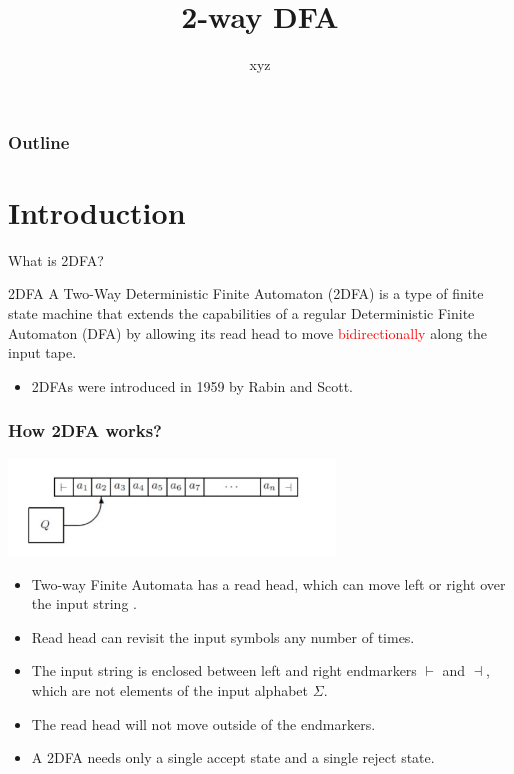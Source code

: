 \documentclass{beamer}
\title[Finite-State Automata]{2-way DFA}
\author{xyz}
\begin{document}
\begin{frame}
\frametitle{Outline}
\tableofcontents
\end{frame}

\section{Introduction}

\begin{frame}{What is 2DFA?}
  \begin{block}{2DFA}
    A Two-Way Deterministic Finite Automaton (2DFA) is a type of finite state machine that extends the capabilities of a regular Deterministic Finite Automaton (DFA) by allowing its read head to move \textcolor{red}{bidirectionally} along the input tape. 
   
    
  \end{block}
  \begin{itemize}
    \item 2DFAs were introduced in 1959 by Rabin and Scott.
   \end{itemize}

\end{frame}

\begin{frame}
\frametitle{How 2DFA works?}
\centering
\includegraphics[width=0.65\textwidth]{Screenshot 2024-03-15 at 3.05.42 PM.pdf}
\begin{itemize}
  \item Two-way Finite Automata has a read head, which
can move left or right over the input string .
\item Read head can revisit the input symbols any number of times.
\item The input string is enclosed between left and right
endmarkers $\vdash$ and $\dashv$, which are not elements of the
input alphabet $\Sigma$.
\item The read head will not move outside of the
endmarkers.
\item A 2DFA needs only a single accept state and a single reject state.
\end{itemize}
\end{frame}
\end{document}
